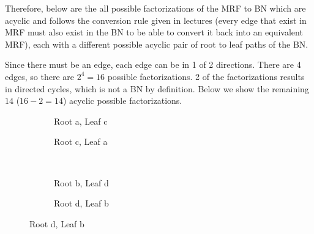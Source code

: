 \documentclass[a4paper,12pt]{article}
\begin{document}
Therefore, below are the all possible factorizations of the MRF to BN which are acyclic and follows the conversion rule given in lectures (every edge that exist in MRF must also exist in the BN to be able to convert it back into an equivalent MRF), each with a different possible acyclic pair of root to leaf paths of the BN.

Since there must be an edge, each edge can be in 1 of 2 directions. There are 4 edges, so there are $2^{4} = 16$ possible factorizations. 2 of the factorizations results in directed cycles, which is not a BN by definition. Below we show the remaining $14$ ($16 - 2 = 14$) acyclic possible factorizations. 

\begin{figure}[!htb]
\centering
\begin{subfigure}[t]{0.48\textwidth}
	\centering	
    \caption*{Root a, Leaf c}
\end{subfigure}
\begin{subfigure}[t]{0.48\textwidth}
	\centering	
    \caption*{Root c, Leaf a}
\end{subfigure}
\\ \vspace{2em}
\begin{subfigure}[t]{0.48\textwidth}
	\centering	
    \caption*{Root b, Leaf d}
\end{subfigure}
\begin{subfigure}[t]{0.48\textwidth}
	\centering	
    \caption*{Root d, Leaf b}

\end{subfigure}
\end{figure}
\end{document}
